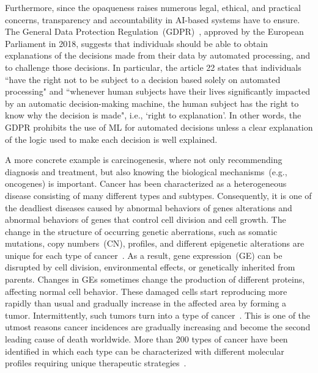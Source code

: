 \hspace*{3.5mm} Furthermore, since the opaqueness raises numerous legal, ethical, and practical concerns, transparency and accountability in AI-based systems have to ensure. The General Data Protection Regulation~(GDPR)~\cite{kaminski2019right}, approved by the European Parliament in 2018, suggests that individuals should be able to obtain explanations of the decisions made from their data by automated processing, and to challenge those decisions. In particular, the article 22 states that individuals ``have the right not to be subject to a decision based solely on automated processing" and ``whenever human subjects have their lives significantly impacted by an automatic decision-making machine, the human subject has the right to know why the decision is made", i.e., `right to explanation'. In other words, the GDPR prohibits the use of ML for automated decisions unless a clear explanation of the logic used to make each decision is well explained. 

\hspace*{3.5mm} A more concrete example is carcinogenesis, where not only recommending diagnosis and treatment, but also knowing the biological mechanisms~(e.g., oncogenes) is important. Cancer has been characterized as a heterogeneous disease consisting of many different types and subtypes. Consequently, it is one of the deadliest diseases caused by abnormal behaviors of genes alterations and abnormal behaviors of genes that control cell division and cell growth. The change in the structure of occurring genetic aberrations, such as somatic mutations, copy numbers~(CN), profiles, and different epigenetic alterations are unique for each type of cancer~\cite{82Tomczak,13cancerdef,19Cruz}. As a result, gene expression~(GE) can be disrupted by cell division, environmental effects, or genetically inherited from parents. Changes in GEs sometimes change the production of different proteins, affecting normal cell behavior. These damaged cells start reproducing more rapidly than usual and gradually increase in the affected area by forming a tumor. Intermittently, such tumors turn into a type of cancer~\cite{zuo2019identification,24Podolsky}. This is one of the utmost reasons cancer incidences are gradually increasing and become the second leading cause of death worldwide. More than 200 types of cancer have been identified in which each type can be characterized with different molecular profiles requiring unique therapeutic strategies~\cite{82Tomczak}. 

